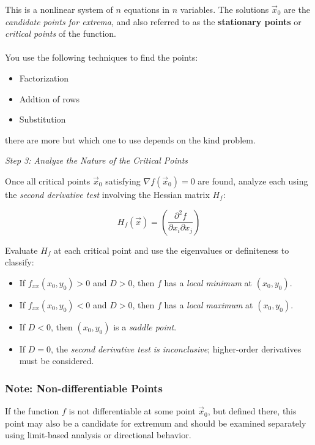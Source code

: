 This is a nonlinear system of \( n \) equations in \( n \) variables. The solutions \( \vec{x}_0 \) 
are the \emph{candidate points for extrema}, and also referred to as the 
\textbf{stationary points} or \emph{critical points} of the function.
\\\\
You use the following techniques to find the points: 
\begin{itemize}[label=\(-\)]
    \item Factorization
    \item Addtion of rows
    \item Substitution
\end{itemize}

there are more but which one to use depends on the kind problem.

\emph{Step 3: Analyze the Nature of the Critical Points}

Once all critical points \( \vec{x}_0 \) satisfying \( \nabla f(\vec{x}_0) = 0 \) are found, analyze each using
 the \emph{second derivative test} involving the Hessian matrix \( H_f \):

\[
H_f(\vec{x}) = \left( \frac{\partial^2 f}{\partial x_i \partial x_j} \right)
\]

Evaluate \( H_f \) at each critical point and use the eigenvalues or definiteness to classify:

\begin{itemize}[label=\(-\)]
    \item If \( f_{xx}(x_0, y_0) > 0 \) and \( D > 0 \), then \( f \) has a \emph{local minimum} at \( (x_0, y_0) \).
    \item If \( f_{xx}(x_0, y_0) < 0 \) and \( D > 0 \), then \( f \) has a \emph{local maximum} at \( (x_0, y_0) \).
    \item If \( D < 0 \), then \( (x_0, y_0) \) is a \emph{saddle point}.
    \item If \( D = 0 \), the \emph{second derivative test is inconclusive}; higher-order derivatives must be considered.
\end{itemize}

\subsubsection{Note: Non-differentiable Points}

If the function \( f \) is not differentiable at some point \( \vec{x}_0 \), but defined there, this point may also be a 
candidate for extremum and should be examined separately using limit-based analysis or directional behavior.

